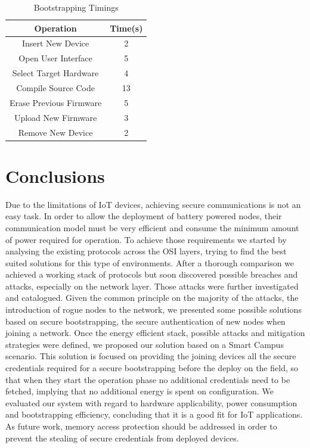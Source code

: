 \documentclass{llncs}
\begin{document}
\begin{table}
\centering
\caption{Bootstrapping Timings}
\label{tab:bootstrapping_time}
\begin{tabular}{|c|c|} \hline
Operation&Time(s)\\ \hline
Insert New Device&2\\ \hline
Open User Interface&5\\ \hline
Select Target Hardware&4\\ \hline
Compile Source Code&13\\ \hline
Erase Previous Firmware&5\\ \hline
Upload New Firmware&3\\ \hline
Remove New Device&2\\ 
\hline\end{tabular}
\end{table}

\section{Conclusions}
\label{sec:conclusion}
Due to the limitations of \ac{IoT} devices, achieving secure communications is not an easy task. In order to allow the deployment of battery powered nodes, their communication model must be very efficient and consume the minimum amount of power required for operation. To achieve those requirements we started by analysing the existing protocols across the OSI layers, trying to find the best suited solutions for this type of environments. After a thorough comparison we achieved a working stack of protocols but soon discovered possible breaches and attacks, especially on the network layer. Those attacks were further investigated and catalogued. Given the common principle on the majority of the attacks, the introduction of rogue nodes to the network, we presented some possible solutions based on secure bootstrapping, the secure authentication of new nodes when joining a network.
Once the energy efficient stack, possible attacks and mitigation strategies were defined, we proposed our solution based on a Smart Campus scenario. This solution is focused on providing the joining devices all the secure credentials required for a secure bootstrapping before the deploy on the field, so that when they start the operation phase no additional credentials need to be fetched, implying that no additional energy is spent on configuration.
We evaluated our system with regard to hardware applicability, power consumption and bootstrapping efficiency, concluding that it is a good fit for \ac{IoT} applications.
As future work, memory access protection should be addressed in order to prevent the stealing of secure credentials from deployed devices.
\end{document}
